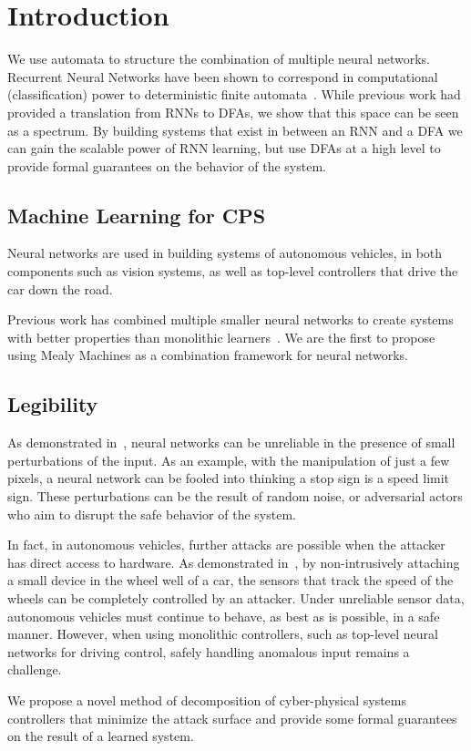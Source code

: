 \section{Introduction}

We use automata to structure the combination of multiple neural networks.
Recurrent Neural Networks have been shown to correspond in computational (classification) power to deterministic finite automata~\cite{tino1998finite}.
While previous work had provided a translation from RNNs to DFAs, we show that this space can be seen as a spectrum.
By building systems that exist in between an RNN and a DFA we can gain the scalable power of RNN learning, but use DFAs at a high level to provide formal guarantees on the behavior of the system.

\subsection{Machine Learning for CPS}

Neural networks are used in building systems of autonomous vehicles, in both components such as vision systems, as well as top-level controllers that drive the car down the road.

Previous work has combined multiple smaller neural networks to create systems with better properties than monolithic learners~\cite{masoudnia2014mixture,baldacchino2016variational}.
We are the first to propose using Mealy Machines as a combination framework for neural networks.

\subsection{Legibility}

As demonstrated in~\cite{DBLP:journals/corr/SzegedyZSBEGF13}, neural networks can be unreliable in the presence of small perturbations of the input.
As an example, with the manipulation of just a few pixels, a neural network can be fooled into thinking a stop sign is a speed limit sign.
These perturbations can be the result of random noise, or adversarial actors who aim to disrupt the safe behavior of the system.

In fact, in autonomous vehicles, further attacks are possible when the attacker has direct access to hardware.
As demonstrated in~\cite{DBLP:journals/iacr/Shoukry0TS15}, by non-intrusively attaching a small device in the wheel well of a car, the sensors that track the speed of the wheels can be completely controlled by an attacker.
Under unreliable sensor data, autonomous vehicles must continue to behave, as best as is possible, in a safe manner.
However, when using monolithic controllers, such as top-level neural networks for driving control, safely handling anomalous input remains a challenge.

We propose a novel method of decomposition of cyber-physical systems controllers that minimize the attack surface and provide some formal guarantees on the result of a learned system.
